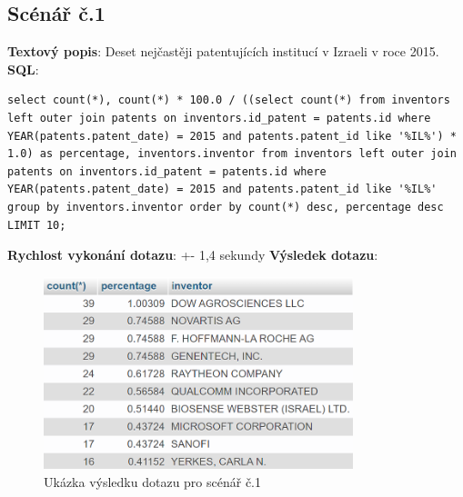 \subsection{Scénář č.1}
\textbf{Textový popis}: Deset nejčastěji patentujících institucí v Izraeli v roce 2015.
\newline
\textbf{SQL}: 
\begin{lstlisting}[label = {lst:elements_a}]
select count(*), count(*) * 100.0 / ((select count(*) from inventors left outer join patents on inventors.id_patent = patents.id where YEAR(patents.patent_date) = 2015 and patents.patent_id like '%IL%') * 1.0) as percentage, inventors.inventor from inventors left outer join patents on inventors.id_patent = patents.id where YEAR(patents.patent_date) = 2015 and patents.patent_id like '%IL%' group by inventors.inventor order by count(*) desc, percentage desc LIMIT 10;
\end{lstlisting}
\textbf{Rychlost vykonání dotazu}:  +- 1,4 sekundy
\newline
\textbf{Výsledek dotazu}:
\begin{figure}[H]
\centering
\includegraphics[width=9cm]{img/scenare/scenar_1}
\caption{Ukázka výsledku dotazu pro scénář č.1}
\label{fig:scenar1}
\end{figure}


